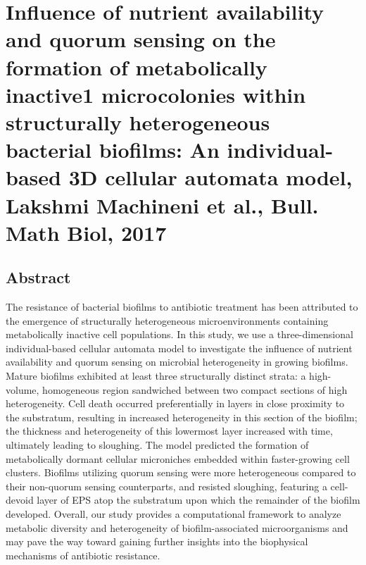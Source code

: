 \documentclass[11pt,a4paper]{article}
\begin{document}
\section*{Influence of nutrient availability and quorum sensing on the formation of metabolically inactive1 microcolonies within structurally heterogeneous bacterial biofilms: An individual-based 3D cellular automata model, Lakshmi Machineni et al., Bull. Math Biol, 2017}
\subsection*{Abstract}
The resistance of bacterial biofilms to antibiotic treatment has been attributed to the emergence of structurally heterogeneous microenvironments containing metabolically inactive cell populations. In this study, we use a three-dimensional individual-based cellular automata model to investigate the influence of nutrient availability and quorum sensing on microbial heterogeneity in growing biofilms. Mature biofilms exhibited at least three structurally distinct strata: a high-volume, homogeneous region sandwiched between two compact sections of high heterogeneity. Cell death occurred preferentially in layers in close proximity to the substratum, resulting in increased heterogeneity in this section of the biofilm; the thickness and heterogeneity of this lowermost layer increased with time, ultimately leading to sloughing. The model predicted the formation of metabolically dormant cellular microniches embedded within faster-growing cell clusters. Biofilms utilizing quorum sensing were more heterogeneous compared to their non-quorum sensing counterparts, and resisted sloughing, featuring a cell-devoid layer of EPS atop the substratum upon which the remainder of the biofilm developed. Overall, our study provides a computational framework to analyze metabolic diversity and heterogeneity of biofilm-associated microorganisms and may pave the way toward gaining further insights into the biophysical mechanisms of antibiotic resistance.
\end{document}
